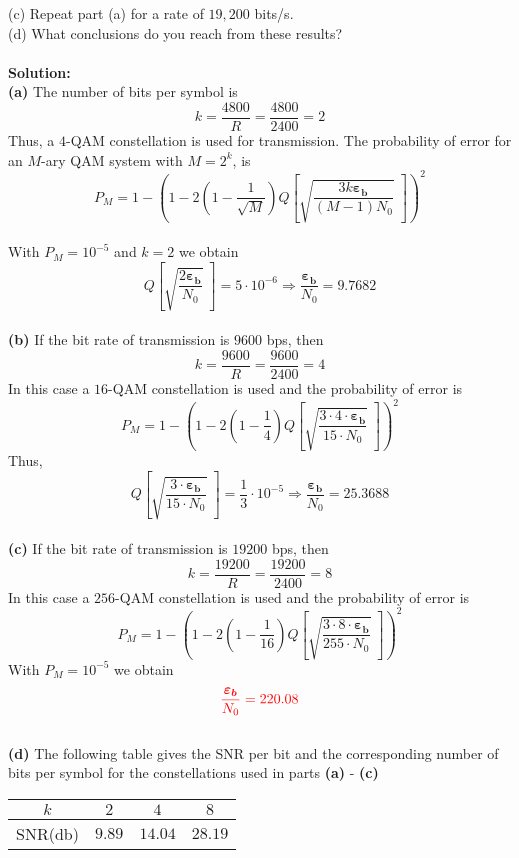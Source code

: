 \documentclass[a4paper,12pt]{article}
\begin{document}
\begin{enumerate}
            (c) Repeat part (a) for a rate of $19,200$ bits/s. \\ 
            (d) What conclusions do you reach from these results? \\  \\ 
            \textbf{Solution:} \\
            \textbf{(a)} The number of bits per symbol is $$k = \frac{4800}{R} = \frac{4800}{2400} = 2$$ Thus, a $4$-QAM constellation is used for transmission. The probability of error for an $M$-ary QAM system with $M = 2^k$, is $$P_M = 1 - \left( 1 - 2 \left( 1 - \frac{1}{\sqrt{M}} \right) Q \left[ \sqrt{\frac{3k\bm{\varepsilon_b}}{(M - 1) N_0}} \; \right] \right)^2$$ \\ 
            With $P_M = 10^{-5}$ and $k = 2$ we obtain $$Q \left[ \sqrt{\frac{2 \bm{\varepsilon_b}}{N_0}} \; \right] = 5 \cdot 10^{-6} \Rightarrow \frac{\bm{\varepsilon_b}}{N_0} = 9.7682$$ \\ 
            \textbf{(b)} If the bit rate of transmission is $9600$ bps, then $$k = \frac{9600}{R} = \frac{9600}{2400} = 4$$ In this case a $16$-QAM constellation is used and the probability of error is $$P_M = 1 - \left( 1 - 2 \left( 1 - \frac{1}{4} \right) Q \left[ \sqrt{\frac{3 \cdot 4 \cdot \bm{\varepsilon_b}}{15 \cdot N_0}} \; \right] \right)^2$$ Thus, $$Q \left[ \sqrt{\frac{3 \cdot \bm{\varepsilon_b}}{15 \cdot N_0}} \; \right] = \frac{1}{3} \cdot 10^{-5} \Rightarrow \frac{\bm{\varepsilon_b}}{N_0} = 25.3688$$ \\ 
            \textbf{(c)} If the bit rate of transmission is $19200$ bps, then $$k = \frac{19200}{R} = \frac{19200}{2400} = 8$$ In this case a $256$-QAM constellation is used and the probability of error is $$P_M = 1 - \left( 1 - 2 \left( 1 - \frac{1}{16} \right) Q \left[ \sqrt{\frac{3 \cdot 8 \cdot \bm{\varepsilon_b}}{255 \cdot N_0}} \; \right] \right)^2$$ With $P_M = 10^{-5}$ we obtain $$\textcolor{red}{\frac{\bm{\varepsilon_b}}{N_0} = 220.08}$$ \\ 
            \newpage
            \textbf{(d)} The following table gives the SNR per bit and the corresponding number of bits per symbol for the constellations used in parts \textbf{(a)} - \textbf{(c)} 
            \begin{center}
                \begin{tabular}{ | c || c | c | c |} 
                 \hline
                 $k$ &  $2$ & $4$ & $8$ \\ 
                 \hline
                 SNR(db) & $9.89$ & $14.04$ & $28.19$ \\ 

\end{tabular}
\end{center}
\end{enumerate}
\end{document}
